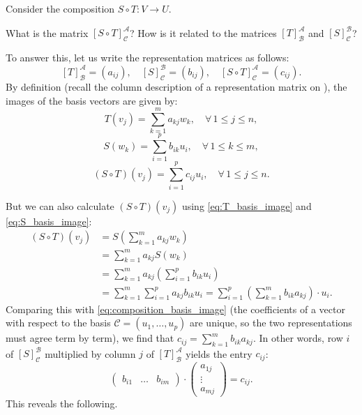 Consider the composition $S \circ T: V \longrightarrow U$.

\begin{question}
What is the matrix $[S \circ T]_{\mathcal{C}}^{\mathcal{A}}$? How is it related to the matrices $[T]_{\mathcal{B}}^{\mathcal{A}}$ and $[S]_{\mathcal{C}}^{\mathcal{B}}$?
\end{question}

To answer this, let us write the representation matrices as follows:
\[
[T]_{\mathcal{B}}^{\mathcal{A}} = (a_{ij}), \quad [S]_{\mathcal{C}}^{\mathcal{B}} = (b_{ij}), \quad [S \circ T]_{\mathcal{C}}^{\mathcal{A}} = (c_{ij}).
\]
By definition (recall the column description of a representation matrix on ), the images of the basis vectors are given by:
\begin{equation}
\label{eq:T_basis_image}
T(v_j) = \sum_{k=1}^m a_{kj} w_k, \quad \forall \, 1 \le j \le n,
\end{equation}
\begin{equation}
\label{eq:S_basis_image}
S(w_k) = \sum_{i=1}^p b_{ik} u_i, \quad \forall \, 1 \le k \le m,
\end{equation}
\begin{equation}
\label{eq:composition_basis_image}
(S \circ T)(v_j) = \sum_{i=1}^p c_{ij} u_i, \quad \forall \, 1 \le j \le n.
\end{equation}

But we can also calculate $(S \circ T)(v_j)$ using \eqref{eq:T_basis_image} and \eqref{eq:S_basis_image}:
\begin{align*}
(S \circ T)(v_j) &= S \left( \sum_{k=1}^m a_{kj} w_k \right) \\
&= \sum_{k=1}^m a_{kj} S(w_k) \\
&= \sum_{k=1}^m a_{kj} \left( \sum_{i=1}^p b_{ik} u_i \right) \\
&= \sum_{k=1}^m \sum_{i=1}^p a_{kj} b_{ik} u_i = \sum_{i=1}^p \left( \sum_{k=1}^m b_{ik} a_{kj} \right) \cdot u_i.
\end{align*}
Comparing this with \eqref{eq:composition_basis_image} (the coefficients of a vector with respect to the basis $\mathcal{C} = (u_1, \dots, u_p)$ are unique, so the two representations must agree term by term), we find that $c_{ij} = \sum_{k=1}^m b_{ik} a_{kj}$. In other words, row $i$ of $[S]_{\mathcal{C}}^{\mathcal{B}}$ multiplied by column $j$ of $[T]_{\mathcal{B}}^{\mathcal{A}}$ yields the entry $c_{ij}$:
\[
\begin{pmatrix}
b_{i1} & \dots & b_{im}
\end{pmatrix}
\cdot 
\begin{pmatrix}
a_{1j} \\
\vdots \\
a_{mj}
\end{pmatrix}
= c_{ij}.
\]
This reveals the following.

